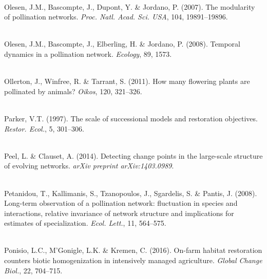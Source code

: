 \documentclass[12pt]{article}
\begin{document}
\begin{thebibliography}{67}
\hspace{0em}\\Olesen, J.M., Bascompte, J., Dupont, Y. \& Jordano, P. (2007).
\newblock The modularity of pollination networks.
\newblock \emph{Proc. Natl. Acad. Sci. USA}, 104, 19891--19896.

\hspace{0em}\\Olesen, J.M., Bascompte, J., Elberling, H. \& Jordano, P. (2008).
\newblock Temporal dynamics in a pollination network.
\newblock \emph{Ecology}, 89, 1573.

\hspace{0em}\\Ollerton, J., Winfree, R. \& Tarrant, S. (2011).
\newblock How many flowering plants are pollinated by animals?
\newblock \emph{Oikos}, 120, 321--326.

\hspace{0em}\\Parker, V.T. (1997).
\newblock The scale of successional models and restoration objectives.
\newblock \emph{Restor. Ecol.}, 5, 301--306.

\hspace{0em}\\Peel, L. \& Clauset, A. (2014).
\newblock Detecting change points in the large-scale structure of evolving
  networks.
\newblock \emph{arXiv preprint arXiv:1403.0989}.

\hspace{0em}\\Petanidou, T., Kallimanis, S., Tzanopoulos, J., Sgardelis, S. \&
  Pantis, J. (2008).
\newblock Long-term observation of a pollination network: fluctuation in
  species and interactions, relative invariance of network structure and
  implications for estimates of specialization.
\newblock \emph{Ecol. Lett.}, 11, 564--575.

\hspace{0em}\\Ponisio, L.C., M'Gonigle, L.K. \& Kremen, C. (2016).
\newblock On-farm habitat restoration counters biotic homogenization in
  intensively managed agriculture.
\newblock \emph{Global Change Biol.}, 22, 704--715.


\end{thebibliography}
\end{document}
